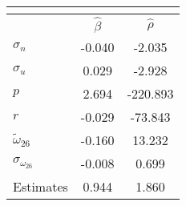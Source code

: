 \begin{tabular}{l*{2}{c}} 
\multicolumn{3}{c}{} \\ \toprule 
& $\hat{\beta}$ & $\hat{\rho}$ \\ \cmidrule(lr){2-3} 
  $\sigma_{n}$ & -0.040 & -2.035 \\ 
  $\sigma_{u}$ & 0.029 & -2.928 \\ 
  $p$ & 2.694 & -220.893 \\ 
  $r$ & -0.029 & -73.843 \\ 
  $\tilde{\omega}_{26}$ & -0.160 & 13.232 \\ 
  $\sigma_{\omega_{26}}$ & -0.008 & 0.699 \\ 
 \midrule Estimates& 0.944 & 1.860 \\ \bottomrule 
 \end{tabular}